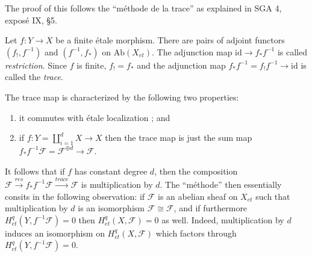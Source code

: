 
The proof of this follows the ``m\'ethode de la trace'' as explained in SGA 4, 
expos\'e IX, \S5. 
\begin{definition}
Let $f : Y \to X$ be a finite \'etale morphism. There are pairs of adjoint 
functors $(f_!,f^{-1})$ and $(f^{-1},f_*)$ on $\text{Ab}(X_{et})$. The 
adjunction map $\text{id} \to f_* f^{-1}$ is called {\it restriction}. Since 
$f$ is finite, $f_! = f_*$ and the adjunction map $f_* f^{-1} = f_! f^{-1} \to 
\text{id}$ is called the {\it trace}.  
\end{definition}

The trace map is characterized by the following two properties:
\begin{enumerate}
\item
it commutes with \'etale localization ; and
\item
if $f: Y = \coprod_{i=1}^d X \to X$ then the trace map is just the sum map $f_* 
f^{-1} \mathcal{F} = \mathcal{F}^{\oplus d} \to \mathcal{F}$.
\end{enumerate}

It follows that if $f$ has constant degree $d$, then the composition 
$\mathcal{F} \xrightarrow{res} f_* f^{-1} \mathcal{F} \xrightarrow{trace} 
\mathcal{F}$ is multiplication by $d$. The ``m\'ethode'' then essentially 
consits in the following observation: if $\mathcal{F}$ is an abelian sheaf on 
$X_{et}$ such that multiplication by $d$ is an isomorphism $\mathcal{F} \cong 
\mathcal{F}$, and if furthermore $H_{et}^q(Y,f^{-1}\mathcal{F}) = 0$ then 
$H_{et}^q(X,\mathcal{F}) = 0$ as well. Indeed, multiplication by $d$ induces an 
isomorphism on $H_{et}^q(X, \mathcal{F})$ which factors through 
$H_{et}^q(Y,f^{-1}\mathcal{F})= 0$.

